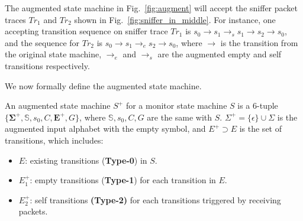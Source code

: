 The augmented state machine in Fig.~\ref{fig:augment} will accept the sniffer
packet traces $Tr_1$ and $Tr_2$ shown in Fig.~\ref{fig:sniffer_in_middle}.  For
instance, one accepting transition sequence on sniffer trace $Tr_1$ is
$s_0\rightarrow s_1 \rightarrow_s s_1\rightarrow s_2 \rightarrow s_0$, and the
sequence for $Tr_2$ is $s_0 \rightarrow s_1 \rightarrow_e s_2 \rightarrow s_0$,
where $\rightarrow$ is the transition from the original state machine,
$\rightarrow_e$ and $\rightarrow_s$ are the augmented empty and self transitions
respectively.

We now formally define the augmented state machine.

\begin{definition}
  An augmented state machine $S^+$ for a monitor state machine $S$ is a 6-tuple
  $\{\boldsymbol{\Sigma^+}, \mathbb{S}, s_0, C, \boldsymbol{E^+}, G\}$, where $\mathbb{S},
  s_0, C, G$ are the same with $S$. $\Sigma^+=\{\epsilon\} \cup \Sigma$ is
  the augmented input alphabet with the empty symbol, and $E^+ \supset E$ is the
  set of transitions, which includes:
  \begin{itemize}
    \item $E$: existing transitions (\textbf{Type-0}) in $S$.
    \item $E^+_1$: empty transitions (\textbf{Type-1}) for each transition in $E$.
    \item $E^+_2$: self transitions \textbf{(Type-2)} for each transitions
      triggered by receiving packets.
  \end{itemize}
\end{definition}

